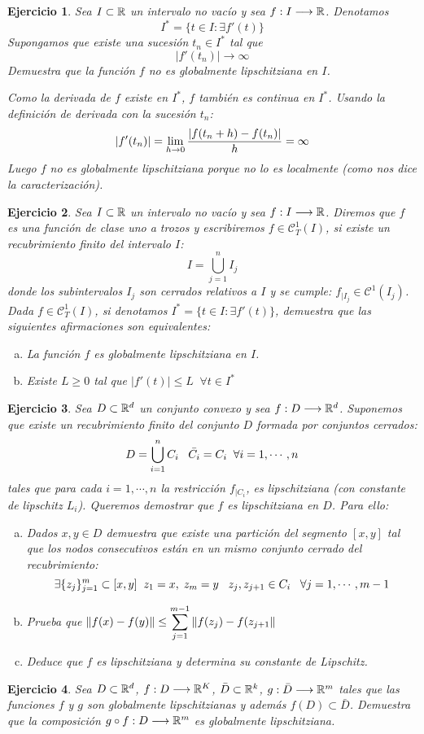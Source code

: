 \documentclass[12pt]{article}
\newtheorem{ejercicio}{Ejercicio}
\theoremstyle{definition}
\theoremstyle{remark}
\begin{document}
\begin{ejercicio}
Sea $I\subset\mathbb{R}$ un intervalo no vacío y sea $f : I \longrightarrow \mathbb{R}$. Denotamos
\[
I^*=\{t\in I:\exists f'(t)\}
\]
Supongamos que existe una sucesión $t_n\in I^*$ tal que
\[
|f'(t_n)|\longrightarrow\infty
\]
Demuestra que la función $f$ no es globalmente lipschitziana en $I$.

Como la derivada de $f$ existe en $I^*$, $f$ también es continua en $I^*$. Usando la definición de derivada con la sucesión $t_n$:
\[
|f'(t_n)|=\displaystyle\lim_{ h \to 0 } \frac{|f(t_n+h)-f(t_n)|}{h}=\infty
\]
Luego $f$ no es globalmente lipschitziana porque no lo es localmente (como nos dice la caracterización).
\end{ejercicio}
\begin{ejercicio}
Sea $I\subset\mathbb{R}$ un intervalo no vacío y sea $f : I \longrightarrow \mathbb{R}$. Diremos que $f$ es una función de clase uno a trozos y escribiremos $f\in \mathcal{C}^1_T(I)$, si existe un recubrimiento finito del intervalo $I$:
\[
I=\bigcup_{j=1}^nI_j
\]
donde los subintervalos $I_j$ son cerrados relativos a $I$ y se cumple: $f_{|I_j}\in\mathcal{C}^1(I_j)$. Dada $f\in\mathcal{C}^1_T(I)$, si denotamos $I^*=\{t\in I:\exists f'(t)\}$, demuestra que las siguientes afirmaciones son equivalentes:
\begin{enumerate}[(a)]
\item La función $f$ es globalmente lipschitziana en $I$.
\item Existe $L\geq 0$ tal que $|f'(t)|\leq L \;\; \forall t\in I^*$
\end{enumerate}
\end{ejercicio}
\begin{ejercicio}
Sea $D\subset\mathbb{R}^d$ un conjunto convexo y sea $f : D \longrightarrow \mathbb{R}^d$. Suponemos que existe un recubrimiento finito del conjunto $D$ formada por conjuntos cerrados:
\[
D=\bigcup_{i=1}^nC_i \;\;\; \bar{C_i}=C_i \;\;\forall i = 1,\cdots,n
\]
tales que para cada $i=1,\cdots,n$ la restricción $f_{|C_i}$, es lipschitziana (con constante de lipschitz $L_i$). Queremos demostrar que $f$ es lipschitziana en $D$. Para ello:
\begin{enumerate}[(a)]
\item Dados $x,y\in D$ demuestra que existe una partición del segmento $[x,y]$ tal que los nodos consecutivos están en un mismo conjunto cerrado del recubrimiento:
\[
\exists\{z_j\}_{j=1}^m\subset[x,y] \;\; z_1=x, \; z_m=y \;\;\; z_j,z_{j+1}\in C_i \;\;\;\forall j=1,\cdots,m-1
\]
\item Prueba que $\left\lVert f(x)-f(y)\right\rVert\leq \displaystyle\sum_{j=1}^{m-1}\left\lVert f(z_j)-f(z_{j+1}\right\rVert$
\item Deduce que $f$ es lipschitziana y determina su constante de Lipschitz.
\end{enumerate}
\end{ejercicio}
\begin{ejercicio}
Sea $D\subset\mathbb{R}^d$, $f : D \longrightarrow \mathbb{R}^K$, $\bar{D}\subset\mathbb{R}^k$, $g : \bar{D} \longrightarrow \mathbb{R}^m$ tales que las funciones $f$ y $g$ son globalmente lipschitzianas y además $f(D)\subset\bar{D}$. Demuestra que la composición $g\circ f : D \longrightarrow \mathbb{R}^m$ es globalmente lipschitziana.
\end{ejercicio}
\end{document}
